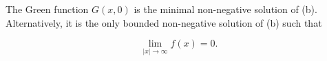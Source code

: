 The Green function $G(x,0)$ is the minimal non-negative solution of (b). Alternatively, it is the only bounded non-negative solution of (b) such that

$$\lim_{|x| \to \infty} f(x) = 0.$$